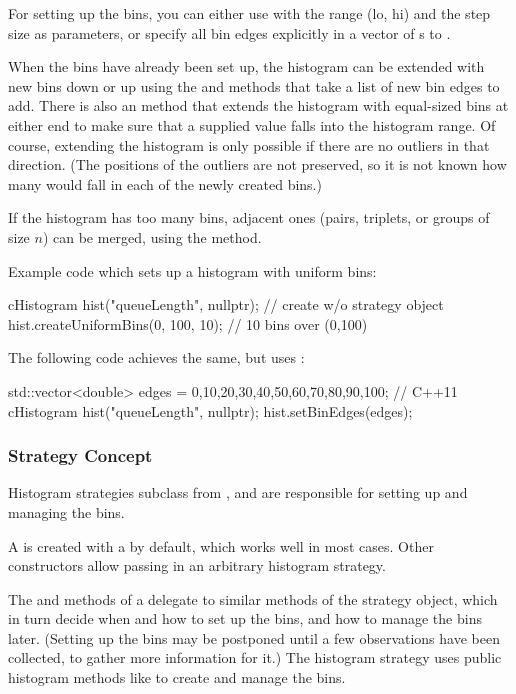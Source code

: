 For setting up the bins, you can either use 
with the range (lo, hi) and the step size as parameters, or specify
all bin edges explicitly in a vector of s to .

When the bins have already been set up, the histogram can be extended
with new bins down or up using the  and 
methods that take a list of new bin edges to add. There is also an
 method that extends the histogram with equal-sized
bins at either end to make sure that a supplied value falls into the
histogram range. Of course, extending the histogram is only possible
if there are no outliers in that direction. (The positions of the
outliers are not preserved, so it is not known how many would fall in
each of the newly created bins.)

If the histogram has too many bins, adjacent ones (pairs, triplets,
or groups of size $n$) can be merged, using the 
method.

Example code which sets up a histogram with uniform bins:

\begin{cpp}
cHistogram hist("queueLength", nullptr); // create w/o strategy object
hist.createUniformBins(0, 100, 10); // 10 bins over (0,100)
\end{cpp}

The following code achieves the same, but uses :

\begin{cpp}
std::vector<double> edges = {0,10,20,30,40,50,60,70,80,90,100}; // C++11
cHistogram hist("queueLength", nullptr);
hist.setBinEdges(edges);
\end{cpp}


\subsubsection{Strategy Concept}
\label{sec:sim-lib:histogram-strategy-concept}

Histogram strategies subclass from , and are
responsible for setting up and managing the bins.

A  is created with a 
by default, which works well in most cases. Other 
constructors allow passing in an arbitrary histogram strategy.

The  and  methods of a
 delegate to similar methods of the strategy
object, which in turn decide when and how to set up the bins,
and how to manage the bins later. (Setting up the bins may be
postponed until a few observations have been collected, to
gather more information for it.) The histogram strategy
uses public histogram methods like 
to create and manage the bins.

